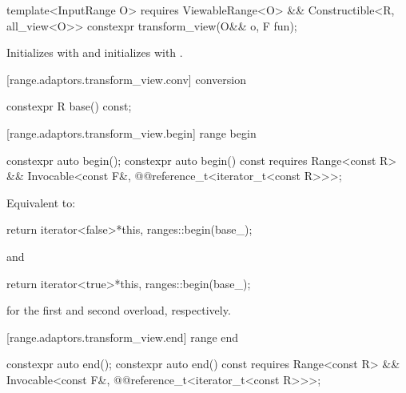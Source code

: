 {%
\begin{itemdecl}
template<InputRange O>
  requires ViewableRange<O> && Constructible<R, all_view<O>>
constexpr transform_view(O&& o, F fun);
\end{itemdecl}

\begin{itemdescr}
\pnum
\effects Initializes  with 
and initializes  with .
\end{itemdescr}

[range.adaptors.transform_view.conv]{ conversion}

%
\begin{itemdecl}
constexpr R base() const;
\end{itemdecl}

\begin{itemdescr}
\pnum
\oldtxt{\returns}  
\end{itemdescr}

[range.adaptors.transform_view.begin]{ range begin}

%
\begin{itemdecl}
constexpr auto begin();
constexpr auto begin() const requires Range<const R> &&
  Invocable<const F&, @@reference_t<iterator_t<const R>>>;
\end{itemdecl}

\begin{itemdescr}
\pnum
\effects Equivalent to:
\begin{codeblock}
return iterator<false>{*this, ranges::begin(base_)};
\end{codeblock}
  and
\begin{codeblock}
return iterator<true>{*this, ranges::begin(base_)};
\end{codeblock}
for the first and second overload, respectively.
\end{itemdescr}

[range.adaptors.transform_view.end]{ range end}

%
\begin{itemdecl}
constexpr auto end();
constexpr auto end() const requires Range<const R> &&
  Invocable<const F&, @@reference_t<iterator_t<const R>>>;
\end{itemdecl}

}
